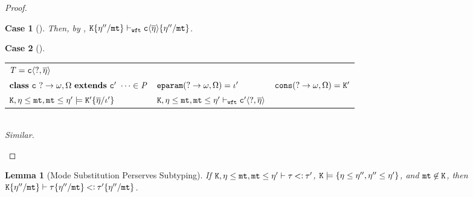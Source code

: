 \documentclass[onecolumn,nocopyrightspace]{sigplanconf}
\newtheorem{lemma}{Lemma}
\theoremstyle{lessintrusive}
\theoremstyle{plain}
\theoremstyle{custom}
\newtheorem*{case}{Case}
\theoremstyle{subcase-custom}
\begin{document}
\begin{proof}
\begin{case}[]
Then, by , $\mathtt{K}\{\eta''/\mathtt{mt}\}\vdash_{\tt wft}\mathtt{c}\langle\overline{\eta}\rangle\{\eta''/\mathtt{mt}\}$.
\end{case} 

\begin{case}[] 
\begin{tabular}[t]{>{$}l<{$} >{$}l<{$} >{$}l<{$}}
\bt = \Cname\lb\dynmode,\overline{\basemode}\rb & & \\
\kwclass\ \Cname\ \dynmode\rightarrow\econs,\espec\ \kwextends\ \Dname\ \dots \in \programcode & \Feparam(\dynmode\rightarrow\econs,\espec) = \listi' & \Fcons(\dynmode\rightarrow\econs,\espec) = \cset' \\
\cset,\basemode\msub\mtvar,\mtvar\msub\basemode'\models\cset'\subst{\listi'}{\overline{\basemode}} & \cset,\basemode\msub\mtvar,\mtvar\msub\basemode'\judgewft\Dname\lb\dynmode,\overline{\basemode}\rb & \\ 
\end{tabular}\\
Similar.
\end{case} 
\end{proof}

\begin{lemma}[Mode Substitution Perserves Subtyping]
\label{pf:modesubstitution-preserves-subtyping}
If $\mathtt{K},\eta\leq\mathtt{mt},\mathtt{mt}\leq\eta'\vdash\tau\mathbin{<\vcentcolon}\tau'$, $\mathtt{K}\models\{\eta\leq\eta'',\eta''\leq\eta'\}$, and $\mathtt{mt} \not\in \mathtt{K}$, then $\mathtt{K}\{\eta''/\mathtt{mt}\}\vdash\tau\{\eta''/\mathtt{mt}\}\mathbin{<\vcentcolon}\tau'\{\eta''/\mathtt{mt}\}$.
\end{lemma}
\end{document}
